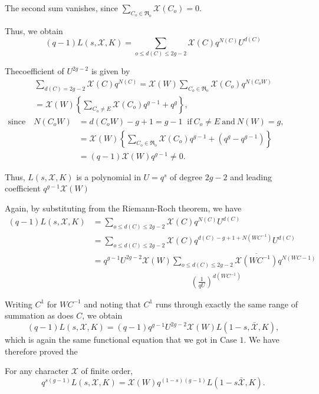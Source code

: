 The second sum vanishes, since $\sum\limits_{C_o \in \mathfrak{R}_o}
\mathcal{X} (C_o) = 0$. 

Thus, we obtain
$$
(q-1) L (s,\mathcal{X}, K) = \sum_{ o \le d (C) \le 2g-2} \mathcal{X}
(C) q^{N (C)} U^{d (C)} 
$$

The\pageoriginale coefficient of $U^{2g-2}$ is given by
\begin{multline*}
  \sum_{d (C) = 2g-2} \mathcal{X} (C) q^{N (C)} = \mathcal{X} (W)
  \sum_{C_o \in \mathfrak{R}_o} \mathcal{X} (C_o) q^{N (C_o
    W)}\\ 
  = \mathcal{X} (W) \left\{ \sum_{C_o \neq E} \mathcal{X} (C_o) q^{g-1} +
  q^g\right\}, 
\end{multline*}
$
\begin{aligned}
  \text{since}\quad  N (C_o W) & = d (C_o W) - g+1 = g-1~\text{ if}~ C_o \neq
  E ~\text{and}~ N (W) = g,\\ 
  & =\mathcal{X} (W) \left\{ \sum_{C_o \in \mathfrak{R}_o}
  \mathcal{X} (C_o) q^{g-1} + (q^g-q^{g-1})\right\}\\ 
  &= (q-1) \mathcal{X}
  (W) q^{g-1} \neq 0.
\end{aligned}
$
\medskip

Thus, $L (s, \mathcal{X},K)$ is a polynomial in $U =q^s$ of degree
$2g-2$ and leading coefficient $q^{g-1} \mathcal{X} (W)$ 

Again, by substituting from the Riemann-Roch theorem, we have
\begin{align*}
   (q-1) L(s, \mathcal{X},K) & = \sum_{o \le d (C) \le 2g-2}
  \mathcal{X} (C) q^{N(C)} U^{d (C)}\\ 
  & = \sum_{o \le d (C) \le 2g-2}
  \mathcal{X} (C) q^{d (C) - g + 1 + N (WC^{-1})} U^{d (C)}\\ 
  & = q^{g-1} U^{2g-2} \mathcal{X} (W) \sum_{ o \le d (C) \le 2g-2}
  \overline{\mathcal{X} (WC^{-1})} q^{N (WC-1)}\\ 
  & \hspace{5cm}\left(\frac{1}{qU}\right)^{d
    (WC^{-1})} 
\end{align*}

Writing $C^1$ for $WC^{-1}$ and noting that $C^1$ runs through exactly
the same range of summation as does $C$, we obtain 
$$
(q-1) L(s, \mathcal{X}, K) = (q-1) q^{g-1} U^{2g-2} \mathcal{X} (W) L
(1-s, \bar{\mathcal{X}}, K), 
$$
which is again the same functional equation that we got in Case
$1$. We have therefore proved the  
\begin{theorem*}
  For any character $\mathcal{X}$ of finite order,
  $$
  q^{s (g-1)} L (s,\mathcal{X}, K) = \mathcal{X} (W) q^{(1-s) (g-1)} L
  (1-s \bar{\mathcal{X}},K). 
  $$
\end{theorem*}
